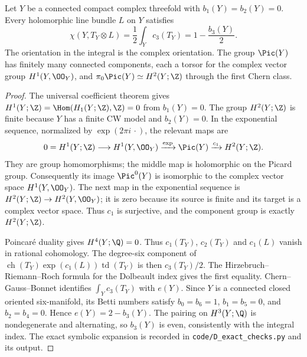 
\begin{proposition}\label{cdp:st:C.1.1}
Let $Y$ be a connected compact complex threefold with
$b_1(Y)=b_2(Y)=0$. Every holomorphic line bundle $L$ on $Y$ satisfies
\[
 \chi(Y,T_Y\otimes L)=\frac12\int_Yc_3(T_Y)
 =1-\frac{b_3(Y)}2.
\]
The orientation in the integral is the complex orientation. The group
$\Pic(Y)$ has finitely many connected components, each a torsor for the
complex vector group $H^1(Y,\OO_Y)$, and
$\pi_0\Pic(Y)\simeq H^2(Y;\Z)$ through the first Chern class.
\end{proposition}
\begin{proof}
The universal coefficient theorem gives
$H^1(Y;\Z)=\Hom(H_1(Y;\Z),\Z)=0$ from $b_1(Y)=0$.
The group $H^2(Y;\Z)$ is finite because $Y$ has a finite CW model and
$b_2(Y)=0$. In the exponential sequence, normalized by
$\exp(2\pi i\,\cdot)$, the relevant maps are
\[
0=H^1(Y;\Z)\longrightarrow H^1(Y,\OO_Y)
 \xrightarrow{\exp} \Pic(Y)
 \xrightarrow{c_1} H^2(Y;\Z).
\]
They are group homomorphisms; the middle map is holomorphic on the
Picard group. Consequently its image $\Pic^0(Y)$ is isomorphic to the
complex vector space $H^1(Y,\OO_Y)$. The next map in the exponential
sequence is $H^2(Y;\Z)\to H^2(Y,\OO_Y)$; it is zero because its
source is finite and its target is a complex vector space. Thus
$c_1$ is surjective, and the component group is exactly $H^2(Y;\Z)$.

Poincar\'e duality gives $H^4(Y;\Q)=0$. Thus
$c_1(T_Y)$, $c_2(T_Y)$ and $c_1(L)$ vanish in rational cohomology.
The degree-six component of
$\operatorname{ch}(T_Y)\exp(c_1(L))\operatorname{td}(T_Y)$ is then
$c_3(T_Y)/2$. The Hirzebruch--Riemann--Roch formula for the Dolbeault
index gives the first equality. Chern--Gauss--Bonnet identifies
$\int_Yc_3(T_Y)$ with $e(Y)$. Since $Y$ is a connected closed oriented
six-manifold, its Betti numbers satisfy
$b_0=b_6=1$, $b_1=b_5=0$, and $b_2=b_4=0$. Hence
$e(Y)=2-b_3(Y)$. The pairing on $H^3(Y;\Q)$ is nondegenerate and
alternating, so $b_3(Y)$ is even, consistently with the integral index.
The exact symbolic expansion is recorded in
\texttt{code/D\_exact\_checks.py} and its output.
\end{proof}


